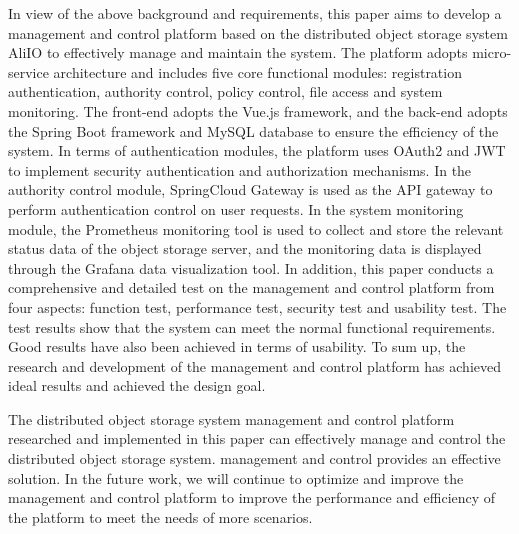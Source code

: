 \begin{abstract*}
  In view of the above background and requirements, this paper aims to develop a management and control platform based on the distributed object 
  storage system AliIO to effectively manage and maintain the system. The platform adopts micro-service architecture and includes five core 
  functional modules: registration authentication, authority control, policy control, file access and system monitoring. The front-end adopts 
  the Vue.js framework, and the back-end adopts the Spring Boot framework and MySQL database to ensure the efficiency of the system. In terms 
  of authentication modules, the platform uses OAuth2 and JWT to implement security authentication and authorization mechanisms. In the authority 
  control module, SpringCloud Gateway is used as the API gateway to perform authentication control on user requests. In the system monitoring 
  module, the Prometheus monitoring tool is used to collect and store the relevant status data of the object storage server, and the monitoring 
  data is displayed through the Grafana data visualization tool. In addition, this paper conducts a comprehensive and detailed test on the 
  management and control platform from four aspects: function test, performance test, security test and usability test. The test results show that 
  the system can meet the normal functional requirements. Good results have also been achieved in terms of usability. To sum up, the research and 
  development of the management and control platform has achieved ideal results and achieved the design goal.

  The distributed object storage system management and control platform researched and implemented in this paper can effectively manage and 
  control the distributed object storage system. management and control provides an effective solution. In the future work, we will continue 
  to optimize and improve the management and control platform to improve the performance and efficiency of the platform to meet the needs of 
  more scenarios.
\end{abstract*}

